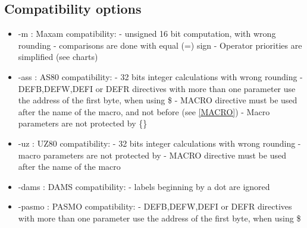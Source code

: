 \begin{xen}
\subsection{Compatibility options}
\begin{itemize}

\item -m : Maxam compatibility:
\subitem - unsigned 16 bit computation, with wrong rounding
\subitem - comparisons are done with equal (=) sign
\subitem - Operator priorities are simplified (see charts)

\item -ass : AS80 compatibility:
\subitem - 32 bits integer calculations with wrong rounding
\subitem - DEFB,DEFW,DEFI or DEFR directives with more than one parameter use the address of the first byte, when using \$
\subitem - MACRO directive must be used after the name of the macro, and not before (see \ref{MACRO})
\subitem - Macro parameters are not protected by \{\}

\item -uz : UZ80 compatibility:
\subitem - 32 bits integer calculations with wrong rounding
\subitem - macro parameters are not protected by {}
\subitem - MACRO directive must be used after the name of the macro

\item -dams : DAMS compatibility:
\subitem - labels beginning by a dot are ignored

\item -pasmo : PASMO compatibility:
\subitem - DEFB,DEFW,DEFI or DEFR directives with more than one parameter use the address of the first byte, when using \$
\end{itemize}

\end{xen}


